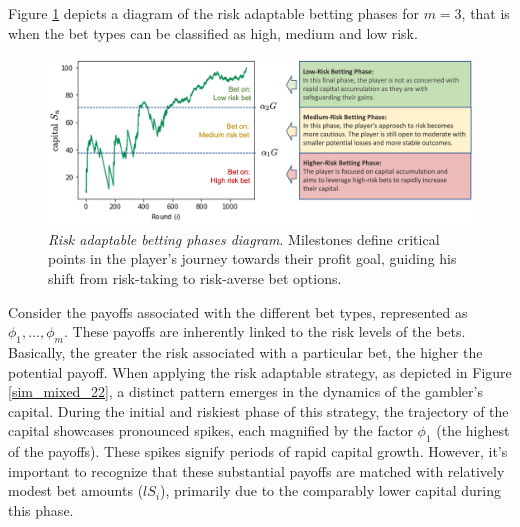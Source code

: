 \documentclass[11pt,twoside]{article}
\numberwithin{Theorem}{section}
\numberwithin{Definition}{section}
\numberwithin{Lemma}{section}
\numberwithin{Algorithm}{section}
\numberwithin{equation}{section}
\begin{document}
Figure \ref{adaptable} depicts a diagram of the risk adaptable betting phases for $m = 3$, that is when the bet types can be classified as high, medium and low risk.

\begin{figure}[H]
        \centering
        \includegraphics[width=16cm]{risk_adaptable_phases.png}
        \caption[Risk adaptable betting phases diagram]{\textit{Risk adaptable betting phases diagram}. Milestones define critical points in the player's journey towards their profit goal, guiding his shift from risk-taking to risk-averse bet options.}\label{adaptable}
\end{figure}

Consider the payoffs associated with the different bet types, represented as $\phi_{1},..., \phi_{m}$. These payoffs are inherently linked to the risk levels of the bets. Basically, the greater the risk associated with a particular bet, the higher the potential payoff.  When applying the risk adaptable strategy, as depicted in Figure \ref{sim_mixed_22}, a distinct pattern emerges in the dynamics of the gambler's capital. During the initial and riskiest phase of this strategy, the trajectory of the capital showcases pronounced spikes, each magnified by the factor $\phi_{1}$ (the highest of the payoffs). These spikes signify periods of rapid capital growth. However, it's important to recognize that these substantial payoffs are matched with relatively modest bet amounts ($lS_{i}$), primarily due to the comparably lower capital during this phase.
\end{document}
